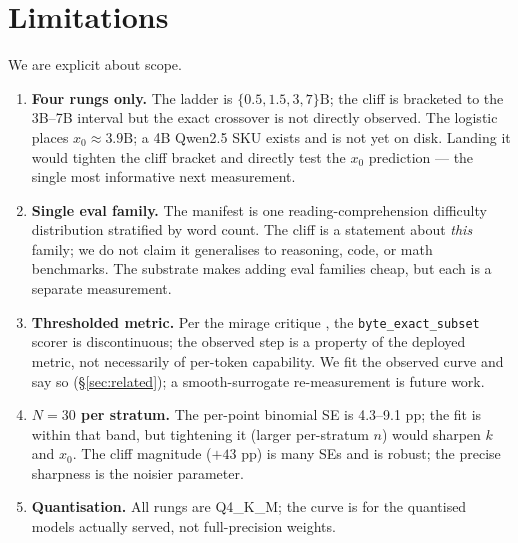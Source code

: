 \documentclass[11pt,a4paper]{article}
\begin{document}
\section{Limitations}
\label{sec:limitations}
We are explicit about scope.
\begin{enumerate}
  \item \textbf{Four rungs only.} The ladder is
    \(\{0.5,1.5,3,7\}\text{B}\); the cliff is bracketed to the 3B--7B
    interval but the exact crossover is not directly observed. The logistic
    places \(x_0\approx 3.9\text{B}\); a 4B Qwen2.5 SKU exists and is not yet
    on disk. Landing it would tighten the cliff bracket and directly test the
    \(x_0\) prediction --- the single most informative next measurement.
  \item \textbf{Single eval family.} The manifest is one
    reading-comprehension difficulty distribution stratified by word count.
    The cliff is a statement about \emph{this} family; we do not claim it
    generalises to reasoning, code, or math benchmarks. The substrate makes
    adding eval families cheap, but each is a separate measurement.
  \item \textbf{Thresholded metric.} Per the mirage critique
    \citep{schaeffer2023mirage}, the \texttt{byte\_exact\_subset} scorer is
    discontinuous; the observed step is a property of the deployed metric, not
    necessarily of per-token capability. We fit the observed curve and say so
    (§\ref{sec:related}); a smooth-surrogate re-measurement is future work.
  \item \textbf{\(N{=}30\) per stratum.} The per-point binomial SE is
    4.3--9.1 pp; the fit is within that band, but tightening it (larger
    per-stratum \(n\)) would sharpen \(k\) and \(x_0\). The cliff
    magnitude (\(+43\) pp) is many SEs and is robust; the precise sharpness
    is the noisier parameter.
  \item \textbf{Quantisation.} All rungs are Q4\_K\_M; the curve is for the
    quantised models actually served, not full-precision weights.
\end{enumerate}
\end{document}
